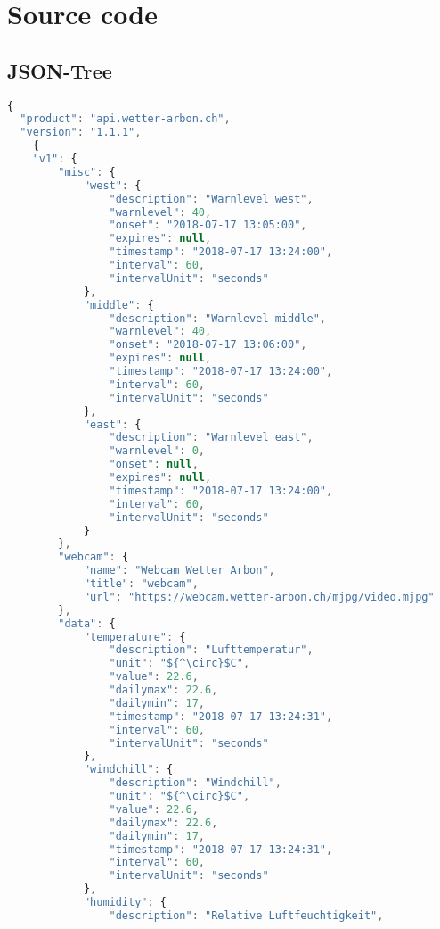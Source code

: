 \section{Source code}

\subsection{JSON-Tree}

\begin{lstlisting}[label=lst:JsonTree,caption=Json Struktur, language=JavaScript, style=htmlcssjs, mathescape]
{
  "product": "api.wetter-arbon.ch",
  "version": "1.1.1",
	{
    "v1": {
        "misc": {
            "west": {
                "description": "Warnlevel west",
                "warnlevel": 40,
                "onset": "2018-07-17 13:05:00",
                "expires": null,
                "timestamp": "2018-07-17 13:24:00",
                "interval": 60,
                "intervalUnit": "seconds"
            },
            "middle": {
                "description": "Warnlevel middle",
                "warnlevel": 40,
                "onset": "2018-07-17 13:06:00",
                "expires": null,
                "timestamp": "2018-07-17 13:24:00",
                "interval": 60,
                "intervalUnit": "seconds"
            },
            "east": {
                "description": "Warnlevel east",
                "warnlevel": 0,
                "onset": null,
                "expires": null,
                "timestamp": "2018-07-17 13:24:00",
                "interval": 60,
                "intervalUnit": "seconds"
            }
        },
        "webcam": {
            "name": "Webcam Wetter Arbon",
            "title": "webcam",
            "url": "https://webcam.wetter-arbon.ch/mjpg/video.mjpg"
        },
        "data": {
            "temperature": {
                "description": "Lufttemperatur",
                "unit": "${^\circ}$C",
                "value": 22.6,
                "dailymax": 22.6,
                "dailymin": 17,
                "timestamp": "2018-07-17 13:24:31",
                "interval": 60,
                "intervalUnit": "seconds"
            },
            "windchill": {
                "description": "Windchill",
                "unit": "${^\circ}$C",
                "value": 22.6,
                "dailymax": 22.6,
                "dailymin": 17,
                "timestamp": "2018-07-17 13:24:31",
                "interval": 60,
                "intervalUnit": "seconds"
            },
            "humidity": {
                "description": "Relative Luftfeuchtigkeit",

\end{lstlisting}
